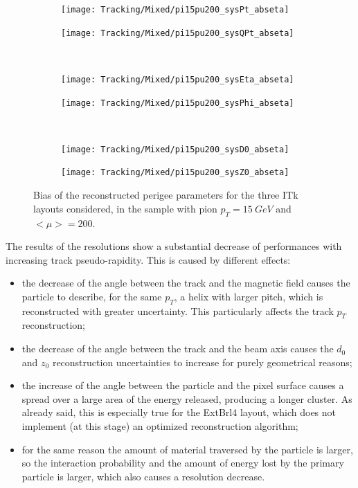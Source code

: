 \documentclass[a4paper,twoside,12pt]{article}
\begin{document}
\begin{figure}
\begin{subfigure}{.5\linewidth}
\texttt{[image: Tracking/Mixed/pi15pu200\_sysPt\_abseta]}
\caption{}
\label{fig:tracking:pi15pu200_sysPt_abseta}
\end{subfigure}
\begin{subfigure}{.5\linewidth}
\texttt{[image: Tracking/Mixed/pi15pu200\_sysQPt\_abseta]}
\caption{}
\label{fig:tracking:pi15pu200_sysQPt_abseta}
\end{subfigure}\\[1ex]
\begin{subfigure}{.5\linewidth}
\texttt{[image: Tracking/Mixed/pi15pu200\_sysEta\_abseta]}
\caption{}
\label{fig:tracking:pi15pu200_sysEta_abseta}
\end{subfigure}
\begin{subfigure}{.5\linewidth}
\texttt{[image: Tracking/Mixed/pi15pu200\_sysPhi\_abseta]}
\caption{}
\label{fig:tracking:pi15pu200_sysPhi_abseta}
\end{subfigure}\\[1ex]
\begin{subfigure}{.5\linewidth}
\texttt{[image: Tracking/Mixed/pi15pu200\_sysD0\_abseta]}
\caption{}
\label{fig:tracking:pi15pu200_sysD0_abseta}
\end{subfigure}
\begin{subfigure}{.5\linewidth}
\texttt{[image: Tracking/Mixed/pi15pu200\_sysZ0\_abseta]}
\caption{}
\label{fig:tracking:pi15pu200_sysZ0_abseta}
\end{subfigure}
\caption{Bias of the reconstructed perigee parameters for the three ITk layouts considered, in the sample with pion $p_{T} = 15\ GeV$ and $<\mu> = 200$.}
\label{fig:tracking:pionBias}
\end{figure}

The results of the resolutions show a substantial decrease of performances with increasing track pseudo-rapidity. This is caused by different effects: 

\begin{itemize}
\item the decrease of the angle between  the track and the magnetic field causes the particle to describe, for the same $p_{T}$, a helix with larger pitch,
	which is reconstructed with greater uncertainty. This particularly affects the track $p_{T}$ reconstruction;
\item the decrease of the angle between the track and the beam axis causes the $d_{0}$ and $z_{0}$ reconstruction uncertainties to increase for purely geometrical reasons;
\item the increase of the angle between the particle and the pixel surface causes a spread over a large area of the energy released, producing a longer cluster. As already
said, this is especially true for the ExtBrl4 layout, which does not implement (at this stage) an optimized reconstruction algorithm;
\item for the same reason the amount of material traversed by the particle is larger, so the interaction probability and the amount of energy lost by the primary particle is larger, which also causes a resolution decrease.
\end{itemize}
\end{document}
